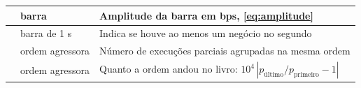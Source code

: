 \begin{quadro}[htbp]
\begin{corpotabela}
\begin{tabularx}{\textwidth}{|L{2.9cm}|L{2.4cm}|Y|}
 & barra & Amplitude da barra em bps, \autoref{eq:amplitude} \\ \hline
{} & barra de 1 s & Indica se houve ao menos um negócio no segundo \\ \hline
{} & ordem agressora & Número de execuções parciais agrupadas na mesma ordem \\ \hline
{} & ordem agressora & Quanto a ordem andou no livro: $10^4\,|p_{\text{último}}/p_{\text{primeiro}} - 1|$ \\ \hline
\end{tabularx}
\end{corpotabela}
\fonteautores[Elaborado]
\end{quadro}
